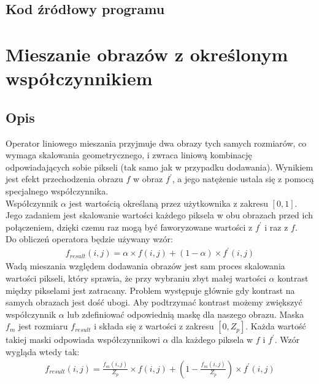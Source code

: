 \documentclass[a4paper,12pt]{book}
\begin{document}
\subsection{Kod źródłowy programu}

\section{Mieszanie obrazów z określonym współczynnikiem}
\subsection{Opis}
Operator liniowego mieszania przyjmuje dwa obrazy tych samych rozmiarów, co wymaga skalowania geometrycznego, i zwraca liniową kombinację odpowiadających sobie pikseli (tak samo jak w przypadku dodawania). Wynikiem jest efekt przechodzenia obrazu $f$ w obraz $f^\prime$, a jego natężenie ustala się z pomocą specjalnego współczynnika. \\
Współczynnik $\alpha$ jest wartością określaną przez użytkownika z zakresu $[0,1]$. Jego zadaniem jest skalowanie wartości każdego piksela w obu obrazach przed ich połączeniem, dzięki czemu raz mogą być faworyzowane wartości z $f^\prime$ i raz z $f$. \\
Do obliczeń operatora będzie używany wzór: 
\begin{gather}
	f_{result}(i,j) = \alpha \times f(i,j) + (1 - \alpha) \times f^\prime(i,j)
\end{gather}
Wadą mieszania względem dodawania obrazów jest sam proces skalowania wartości pikseli, który sprawia, że przy wybraniu zbyt małej wartości $\alpha$ kontrast między pikselami jest zatracany. Problem występuje głównie gdy kontrast na samych obrazach jest dość ubogi. Aby podtrzymać kontrast możemy zwiększyć współczynnik $\alpha$ lub zdefiniować odpowiednią maskę dla naszego obrazu. Maska $f_m$ jest rozmiaru $f_{result}$ i składa się z wartości z zakresu $[0, Z_p]$. Każda wartość takiej maski odpowiada współczynnikowi $\alpha$ dla każdego piksela w $f$ i $f^\prime$. Wzór wygląda wtedy tak: 
\begin{gather}
	f_{result}(i,j) = \frac{f_m(i,j)}{Z_p} \times f(i,j) + (1 - \frac{f_m(i,j)}{Z_p}) \times f^\prime(i,j)
\end{gather}
\end{document}
